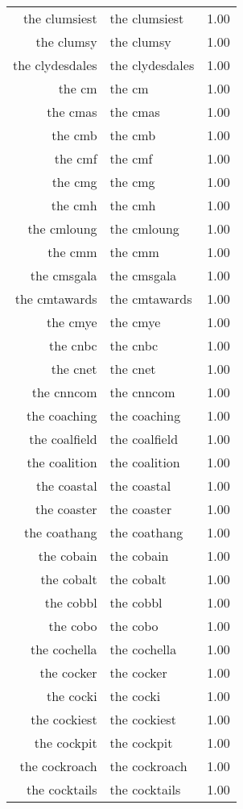 \begin{table}[ht]
\begin{tabular}{rlr}
  the clumsiest & the clumsiest & 1.00 \\ 
  the clumsy & the clumsy & 1.00 \\ 
  the clydesdales & the clydesdales & 1.00 \\ 
  the cm & the cm & 1.00 \\ 
  the cmas & the cmas & 1.00 \\ 
  the cmb & the cmb & 1.00 \\ 
  the cmf & the cmf & 1.00 \\ 
  the cmg & the cmg & 1.00 \\ 
  the cmh & the cmh & 1.00 \\ 
  the cmloung & the cmloung & 1.00 \\ 
  the cmm & the cmm & 1.00 \\ 
  the cmsgala & the cmsgala & 1.00 \\ 
  the cmtawards & the cmtawards & 1.00 \\ 
  the cmye & the cmye & 1.00 \\ 
  the cnbc & the cnbc & 1.00 \\ 
  the cnet & the cnet & 1.00 \\ 
  the cnncom & the cnncom & 1.00 \\ 
  the coaching & the coaching & 1.00 \\ 
  the coalfield & the coalfield & 1.00 \\ 
  the coalition & the coalition & 1.00 \\ 
  the coastal & the coastal & 1.00 \\ 
  the coaster & the coaster & 1.00 \\ 
  the coathang & the coathang & 1.00 \\ 
  the cobain & the cobain & 1.00 \\ 
  the cobalt & the cobalt & 1.00 \\ 
  the cobbl & the cobbl & 1.00 \\ 
  the cobo & the cobo & 1.00 \\ 
  the cochella & the cochella & 1.00 \\ 
  the cocker & the cocker & 1.00 \\ 
  the cocki & the cocki & 1.00 \\ 
  the cockiest & the cockiest & 1.00 \\ 
  the cockpit & the cockpit & 1.00 \\ 
  the cockroach & the cockroach & 1.00 \\ 
  the cocktails & the cocktails & 1.00 \\ 

\end{tabular}
\end{table}
